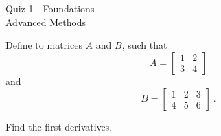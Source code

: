 \documentclass[10pt]{exam2}
\begin{document}
\begin{center}
{\LARGE Quiz 1 - Foundations}\\\vspace{2mm}
\vspace{3mm}
{\large Advanced Methods}\\\vspace{2mm}
\end{center}

\begin{questions}
\question Define to matrices $A$ and $B$, such that 
\begin{equation}\nonumber
A = \begin{bmatrix}
       1 & 2           \\
       3 & 4
     \end{bmatrix}
\end{equation}
and 
\begin{equation}
B = \begin{bmatrix}\nonumber
       1 & 2 & 3           \\
       4 & 5 & 6
     \end{bmatrix}~\text{.}
\end{equation}


\question Find the first derivatives.
\end{questions}
\end{document}
